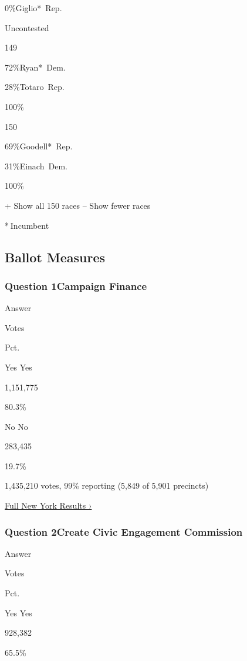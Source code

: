  0\%Giglio*~Rep.

Uncontested

149

 72\%Ryan*~Dem.

 28\%Totaro~Rep.

100\%

150

 69\%Goodell*~Rep.

 31\%Einach~Dem.

100\%

+ Show all 150 races -- Show fewer races

* Incumbent~

\hypertarget{ballot-measures}{%
\subsection{Ballot Measures}\label{ballot-measures}}

\hypertarget{question-1campaign-finance}{%
\subsubsection{Question 1Campaign
Finance}\label{question-1campaign-finance}}

Answer

Votes

Pct.

 Yes Yes

1,151,775

80.3\%

 No No

283,435

19.7\%

1,435,210 votes, 99\% reporting (5,849 of 5,901 precincts)

\href{https://www.nytimes3xbfgragh.onion/interactive/2018/11/06/us/elections/results-new-york-elections.html}{Full
New York Results ›}

\hypertarget{question-2create-civic-engagement-commission}{%
\subsubsection{Question 2Create Civic Engagement
Commission}\label{question-2create-civic-engagement-commission}}

Answer

Votes

Pct.

 Yes Yes

928,382

65.5\%

